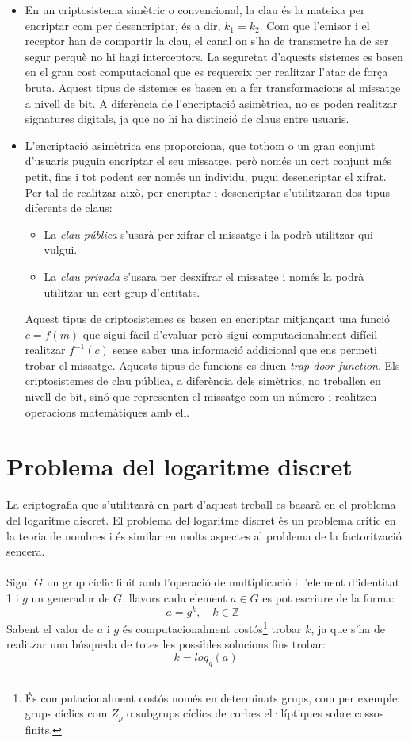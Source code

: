 \documentclass{article}
\begin{document}
\begin{itemize}
	\item En un criptosistema simètric o convencional, la clau és la mateixa per encriptar com per desencriptar, és a dir, $k_1 = k_2$. Com que l'emisor i el receptor han de compartir la clau, el canal on s'ha de transmetre ha de ser segur perquè no hi hagi interceptors. La seguretat d'aquests sistemes es basen en el gran cost computacional que es requereix per realitzar l'atac de força bruta. Aquest tipus de sistemes es basen en a fer transformacions al missatge a nivell de bit. A diferència de l'encriptació asimètrica, no es poden realitzar signatures digitals, ja que no hi ha distinció de claus entre usuaris.
	\item L'encriptació asimètrica ens proporciona, que tothom o un gran conjunt d'usuaris puguin encriptar el seu missatge, però només un cert conjunt més petit, fins i tot podent ser només un individu, pugui desencriptar el xifrat. Per tal de realitzar això, per encriptar i desencriptar s'utilitzaran dos tipus diferents de claus:
	\begin{itemize}
		\item La \textit{clau pública} s'usarà per xifrar el missatge i la podrà utilitzar qui vulgui.
		\item La \textit{clau privada} s'usara per desxifrar el missatge i només la podrà utilitzar un cert grup d'entitats.
	\end{itemize}
	Aquest tipus de criptosistemes es basen en encriptar mitjançant una funció $c = f(m)$ que sigui fàcil d'evaluar però sigui computacionalment difícil realitzar $f^{-1}(c)$ sense saber una informació addicional que ens permeti trobar el missatge. Aquests tipus de funcions es diuen \textit{trap-door function}.
	Els criptosistemes de clau pública, a diferència dels simètrics, no treballen en nivell de bit, sinó que representen el missatge com un número i realitzen operacions matemàtiques amb ell. 
\end{itemize}

\section{Problema del logaritme discret}
La criptografia que s'utilitzarà en part d'aquest treball es basarà en el problema del logaritme discret.
El problema del logaritme discret és un problema crític en la teoria de nombres i és similar en molts aspectes al problema de la factorització sencera.
\\
\\
Sigui $G$ un grup cíclic finit amb l'operació de multiplicació i l'element d'identitat 1 i $g$ un generador de $G$, llavors cada element $a \in G$ es pot escriure de la forma:
\[a = g^k, \quad k \in \mathbb{Z^+} \] 
Sabent el valor de $a$ i $g$ és computacionalment costós\footnote{És computacionalment costós només en determinats grups, com per exemple: grups cíclics com $Z_p$ o subgrups cíclics de corbes el·líptiques sobre cossos finits. %
} trobar $k$, ja que s'ha de realitzar una búsqueda de totes les possibles solucions fins trobar:
\[k = log_g(a)\]
\end{document}
